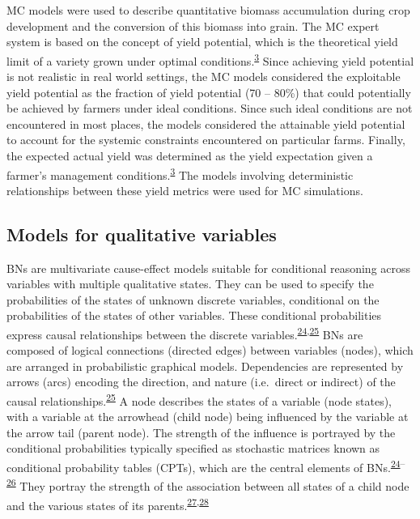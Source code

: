 \documentclass[]{elsarticle} %
\begin{document}
MC models were used to describe quantitative biomass accumulation during crop development and the conversion of this biomass into grain. The MC expert system is based on the concept of yield potential, which is the theoretical yield limit of a variety grown under optimal conditions.\textsuperscript{\protect\hyperlink{ref-VanIttersum_et_al_2013}{3}} Since achieving yield potential is not realistic in real world settings, the MC models considered the exploitable yield potential as the fraction of yield potential (70 -- 80\%) that could potentially be achieved by farmers under ideal conditions. Since such ideal conditions are not encountered in most places, the models considered the attainable yield potential to account for the systemic constraints encountered on particular farms. Finally, the expected actual yield was determined as the yield expectation given a farmer's management conditions.\textsuperscript{\protect\hyperlink{ref-VanIttersum_et_al_2013}{3}} The models involving deterministic relationships between these yield metrics were used for MC simulations.

\hypertarget{ref33}{%
\subsection{Models for qualitative variables}\label{ref33}}

BNs are multivariate cause-effect models suitable for conditional reasoning across variables with multiple qualitative states. They can be used to specify the probabilities of the states of unknown discrete variables, conditional on the probabilities of the states of other variables. These conditional probabilities express causal relationships between the discrete variables.\textsuperscript{\protect\hyperlink{ref-Jensen_1996}{24},\protect\hyperlink{ref-Pearl_1988}{25}} BNs are composed of logical connections (directed edges) between variables (nodes), which are arranged in probabilistic graphical models. Dependencies are represented by arrows (arcs) encoding the direction, and nature (i.e.~direct or indirect) of the causal relationships.\textsuperscript{\protect\hyperlink{ref-Pearl_1988}{25}} A node describes the states of a variable (node states), with a variable at the arrowhead (child node) being influenced by the variable at the arrow tail (parent node). The strength of the influence is portrayed by the conditional probabilities typically specified as stochastic matrices known as conditional probability tables (CPTs), which are the central elements of BNs.\textsuperscript{\protect\hyperlink{ref-Jensen_1996}{24}--\protect\hyperlink{ref-Fenton_and_Neil_2013}{26}} They portray the strength of the association between all states of a child node and the various states of its parents.\textsuperscript{\protect\hyperlink{ref-Hansson_and_Sjokvist_2013}{27},\protect\hyperlink{ref-Scutari_and_Denis_2015}{28}}
\end{document}
